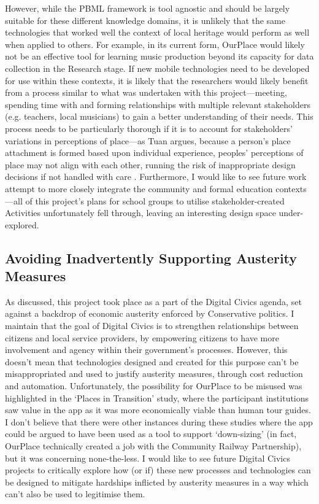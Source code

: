 However, while the PBML framework is tool agnostic and should be largely suitable for these different knowledge domains, it is unlikely that the same technologies that worked well the context of local heritage would perform as well when applied to others. For example, in its current form, OurPlace would likely not be an effective tool for learning music production beyond its capacity for data collection in the Research stage. If new mobile technologies need to be developed for use within these contexts, it is likely that the researchers would likely benefit from a process similar to what was undertaken with this project---meeting, spending time with and forming relationships with multiple relevant stakeholders (e.g. teachers, local musicians) to gain a better understanding of their needs. This process needs to be particularly thorough if it is to account for stakeholders' variations in perceptions of place---as Tuan argues, because a person’s place attachment is formed based upon individual experience, peoples' perceptions of place may not align with each other, running the risk of inappropriate design decisions if not handled with care \citep{Tuan1978}. Furthermore, I would like to see future work attempt to more closely integrate the community and formal education contexts---all of this project's plans for school groups to utilise stakeholder-created Activities unfortunately fell through, leaving an interesting design space under-explored.

\subsection*{Avoiding Inadvertently Supporting Austerity Measures} 

As discussed, this project took place as a part of the Digital Civics agenda, set against a backdrop of economic austerity enforced by Conservative politics. I maintain that the goal of Digital Civics is to strengthen relationships between citizens and local service providers, by empowering citizens to have more involvement and agency within their government’s processes. However, this doesn't mean that technologies designed and created for this purpose can't be misappropriated and used to justify austerity measures, through cost reduction and automation. Unfortunately, the possibility for OurPlace to be misused was highlighted in the `Places in Transition' study, where the participant institutions saw value in the app as it was more economically viable than human tour guides. I don't believe that there were other instances during these studies where the app could be argued to have been used as a tool to support `down-sizing' (in fact, OurPlace technically created a job with the Community Railway Partnership), but it was concerning none-the-less. I would like to see future Digital Civics projects to critically explore how (or if) these new processes and technologies can be designed to mitigate hardships inflicted by austerity measures in a way which can't also be used to legitimise them.


